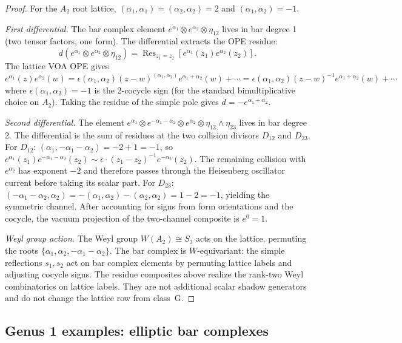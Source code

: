 \begin{proof}
For the $A_2$ root lattice, $(\alpha_1, \alpha_1) = (\alpha_2, \alpha_2) = 2$ and $(\alpha_1, \alpha_2) = -1$.

\emph{First differential.}
The bar complex element $e^{\alpha_1} \otimes e^{\alpha_2} \otimes \eta_{12}$ lives in bar degree 1 (two tensor factors, one form). The differential extracts the OPE residue:
\[
d(e^{\alpha_1} \otimes e^{\alpha_2} \otimes \eta_{12}) = \operatorname{Res}_{z_1 = z_2}\left[e^{\alpha_1}(z_1) e^{\alpha_2}(z_2)\right].
\]
The lattice VOA OPE gives $e^{\alpha_1}(z) e^{\alpha_2}(w) = \epsilon(\alpha_1, \alpha_2)(z-w)^{(\alpha_1,\alpha_2)} e^{\alpha_1+\alpha_2}(w) + \cdots = \epsilon(\alpha_1, \alpha_2)(z-w)^{-1} e^{\alpha_1+\alpha_2}(w) + \cdots$ where $\epsilon(\alpha_1, \alpha_2) = -1$ is the 2-cocycle sign (for the standard bimultiplicative choice on $A_2$). Taking the residue of the simple pole gives $d = -e^{\alpha_1 + \alpha_2}$.

\emph{Second differential.}
The element $e^{\alpha_1} \otimes e^{-\alpha_1-\alpha_2} \otimes e^{\alpha_2} \otimes \eta_{12} \wedge \eta_{23}$ lives in bar degree 2. The differential is the sum of residues at the two collision divisors $D_{12}$ and $D_{23}$. For $D_{12}$: $(\alpha_1, -\alpha_1 - \alpha_2) = -2 + 1 = -1$, so $e^{\alpha_1}(z_1) e^{-\alpha_1-\alpha_2}(z_2) \sim \epsilon \cdot (z_1-z_2)^{-1} e^{-\alpha_2}(z_2)$. The remaining collision with $e^{\alpha_2}$ has exponent $-2$ and therefore passes through the Heisenberg oscillator current before taking its scalar part. For $D_{23}$: $(-\alpha_1-\alpha_2, \alpha_2) = -(\alpha_1,\alpha_2) - (\alpha_2,\alpha_2) = 1-2 = -1$, yielding the symmetric channel. After accounting for signs from form orientations and the cocycle, the vacuum projection of the two-channel composite is $e^0 = 1$.

\emph{Weyl group action.}
The Weyl group $W(A_2) \cong S_3$ acts on the lattice, permuting the roots $\{\alpha_1, \alpha_2, -\alpha_1-\alpha_2\}$. The bar complex is $W$-equivariant: the simple reflections $s_1, s_2$ act on bar complex elements by permuting lattice labels and adjusting cocycle signs. The residue composites above realize the rank-two Weyl combinatorics on lattice labels. They are not additional scalar shadow generators and do not change the lattice row from class~G.
\end{proof}

\subsection{Genus 1 examples: elliptic bar complexes}

